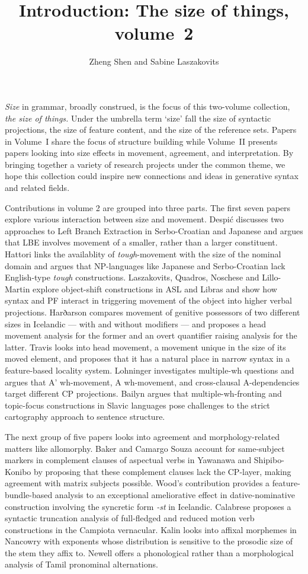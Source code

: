 \documentclass[output=paper]{langscibook}
\title{Introduction: The size of things, volume~2}
\author{
    Zheng Shen%
        \affiliation{National University of Singapore}
    and 
    Sabine Laszakovits%
        \affiliation{Austrian Academy of Sciences; University of Connecticut}
}
\begin{document}
\maketitle


\noindent \textit{Size} in grammar, broadly construed, is the focus of this two-volume collection, \textit{the size of things.}
Under the umbrella term `size' fall the size of syntactic projections, the size of feature content, and the size of the reference sets. 
Papers in Volume~I share the focus of structure building while Volume~II presents papers looking into size effects in movement, agreement, and interpretation. 
By bringing together a variety of research projects under the common theme, we hope this collection could inspire new connections and ideas in generative syntax and related fields. 

Contributions in volume 2 are grouped into three parts. The first seven papers explore various interaction between size and movement. 
Despić discusses two approaches to Left Branch Extraction in Serbo-Croatian and Japanese and argues that LBE involves movement of a smaller, rather than a larger constituent.
Hattori links the availablity of \textit{tough}-movement with the size of the nominal domain and argues that NP-languages like Japanese and Serbo-Croatian lack English-type \textit{tough} constructions. 
Laszakovits, Quadros, Noschese and Lillo-Martin explore object-shift constructions in ASL and Libras and show how syntax and PF interact in triggering movement of the object into higher verbal projections. 
Harðarson compares movement of genitive possessors of two different sizes in Icelandic --- with and without modifiers --- and proposes a head movement analysis for the former and an overt quantifier raising analysis for the latter.
Travis looks into head movement, a movement unique in the size of its moved element, and proposes that it has a natural place in narrow syntax in a feature-based locality system.
Lohninger investigates multiple-wh questions and argues that A' wh-movement, A wh-movement, and cross-clausal A-dependencies target different CP projections. 
Bailyn argues that multiple-wh-fronting and topic-focus constructions in Slavic languages pose challenges to the strict cartography approach to sentence structure. 

The next group of five papers looks into agreement and morphology-related matters like allomorphy. 
Baker and Camargo Souza account for same-subject markers in complement clauses of aspectual verbs in Yawanawa and Shipibo-Konibo by proposing that these complement clauses lack the CP-layer, making agreement with matrix subjects possible.
Wood's contribution provides a feature-bundle-based analysis to an exceptional ameliorative effect in dative-nominative construction involving the syncretic form \textit{-st} in Icelandic.
Calabrese proposes a syntactic truncation analysis of full-fledged and reduced motion verb constructions in the Campiota vernacular. 
Kalin looks into affixal morphemes in Nancowry with exponents whose distribution is sensitive to the prosodic size of the stem they affix to.
Newell offers a phonological rather than a morphological analysis of Tamil pronominal alternations. 
\end{document}
